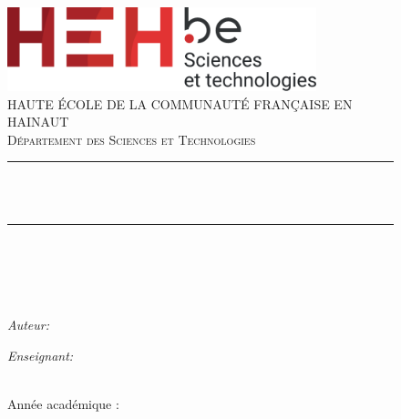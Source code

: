 \thispagestyle{empty}

\begin{figure}[!t]
  \centering
  \includegraphics[width=0.8\textwidth]{img/logo/tech.pdf}\\[1cm]
  \textsc{\large HAUTE ÉCOLE DE LA COMMUNAUTÉ FRANÇAISE EN HAINAUT}\\[0.5cm]
  \textsc{\large Département des Sciences et Technologies}\\[2.5cm]

\end{figure}

\begin{figure}
  \centering
  \begingroup
  \rule{\linewidth}{0.5mm}\\
  \makeatletter
  \huge \@title \\
  \vspace{0.5cm}
  \large \soustitre

  \rule{\linewidth}{0.5mm}\\[1cm]
  \endgroup
\end{figure}


\begin{figure}
  \centering
  \textsc{\LARGE \cours}\\[0.5cm]
  \textsc{\large \cursus}\\[2cm]
\end{figure}

\begin{figure}[!b]
  \centering
  \begin{minipage}[t]{0.45 \textwidth}
    \begin{flushleft} \large
      \emph{Auteur:}\\
      \makeatletter
      \auteur
    \end{flushleft}
  \end{minipage}
%
  \begin{minipage}[t]{0.45 \textwidth}
    \begin{flushright}
      \large \emph{Enseignant:} \\
      \teacher
    \end{flushright}
  \end{minipage}\\[3cm]

  Année académique : \academicyear
\end{figure}
\newpage

